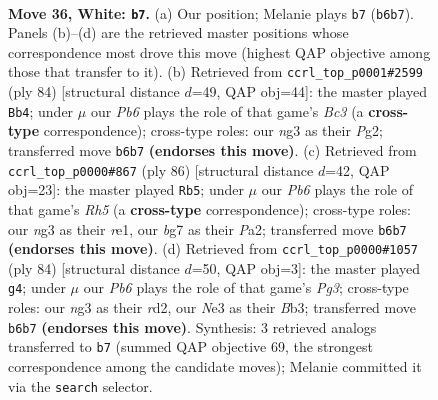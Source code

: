 \documentclass[11pt]{article}
\begin{document}
\clearpage

\begin{figure}[p]\centering
\begin{subfigure}{0.46\textwidth}\centering
\resizebox{\linewidth}{!}{%
\newchessgame
\chessboard[
  setfen={r6k/6b1/nP6/R7/2P5/4N1n1/8/1RB3K1 w - - 1 36},
  showmover=false,
  pgfstyle=straightmove, color=movearrow, markmove={b6-b7}
]}
\caption{}
\end{subfigure}\hfill
\begin{subfigure}{0.46\textwidth}\centering
\resizebox{\linewidth}{!}{%
\newchessgame
\chessboard[
  setfen={5k2/8/1Rnr4/8/8/1PB5/b4KP1/8 w - - 0 43},
  showmover=false,
  pgfstyle=straightmove, color=movearrow, markmove={c3-b4}
]}
\caption{}
\end{subfigure}
\\[4pt]
\begin{subfigure}{0.46\textwidth}\centering
\resizebox{\linewidth}{!}{%
\newchessgame
\chessboard[
  setfen={8/pp2n1k1/3B1b2/7R/8/1B5P/P1K5/4r3 w - - 1 44},
  showmover=false,
  pgfstyle=straightmove, color=movearrow, markmove={h5-b5}
]}
\caption{}
\end{subfigure}\hfill
\begin{subfigure}{0.46\textwidth}\centering
\resizebox{\linewidth}{!}{%
\newchessgame
\chessboard[
  setfen={5k2/8/3b3p/2p2P2/8/1BR3PP/3r4/7K w - - 3 43},
  showmover=false,
  pgfstyle=straightmove, color=movearrow, markmove={g3-g4}
]}
\caption{}
\end{subfigure}
\caption{\textbf{Move 36, White: \texttt{b7}.} (a) Our position; Melanie plays \texttt{b7} (\texttt{b6b7}). Panels (b)--(d) are the retrieved master positions whose correspondence most drove this move (highest QAP objective among those that transfer to it). (b) Retrieved from \texttt{ccrl\_top\_p0001\#2599} (ply 84) [structural distance $d$=49, QAP obj=44]: the master played \texttt{Bb4}; under $\mu$ our \emph{Pb6} plays the role of that game's \emph{Bc3} (a \textbf{cross-type} correspondence); cross-type roles: our \emph{n}g3 as their \emph{P}g2; transferred move \texttt{b6b7} \textbf{(endorses this move)}. (c) Retrieved from \texttt{ccrl\_top\_p0000\#867} (ply 86) [structural distance $d$=42, QAP obj=23]: the master played \texttt{Rb5}; under $\mu$ our \emph{Pb6} plays the role of that game's \emph{Rh5} (a \textbf{cross-type} correspondence); cross-type roles: our \emph{n}g3 as their \emph{r}e1, our \emph{b}g7 as their \emph{P}a2; transferred move \texttt{b6b7} \textbf{(endorses this move)}. (d) Retrieved from \texttt{ccrl\_top\_p0000\#1057} (ply 84) [structural distance $d$=50, QAP obj=3]: the master played \texttt{g4}; under $\mu$ our \emph{Pb6} plays the role of that game's \emph{Pg3}; cross-type roles: our \emph{n}g3 as their \emph{r}d2, our \emph{N}e3 as their \emph{B}b3; transferred move \texttt{b6b7} \textbf{(endorses this move)}. Synthesis: 3 retrieved analogs transferred to \texttt{b7} (summed QAP objective 69, the strongest correspondence among the candidate moves); Melanie committed it via the \texttt{search} selector.}
\label{fig:thought-m70}
\end{figure}
\end{document}
